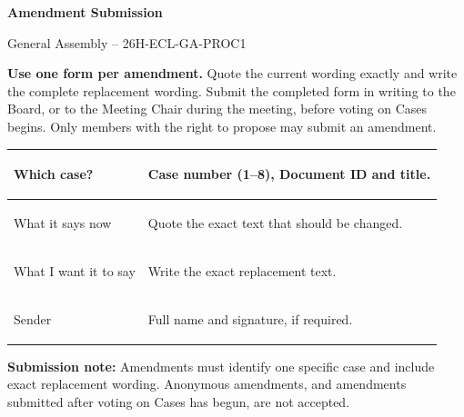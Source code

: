 \documentclass{../../../Common/Latex/Templates/rapport}
\date{\meetingdate, \meetingtime}
\begin{document}
\reportmainmatter
\small
\setlength{\parindent}{0pt}
\setlength{\tabcolsep}{6pt}
\renewcommand{\arraystretch}{1.2}

\begin{center}
  {\Large\bfseries Amendment Submission}\par
  \vspace{0.15cm}
  {\normalsize General Assembly -- 26H-ECL-GA-PROC1}\par
  \vspace{0.1cm}
  {\small \meetingline}\par
\end{center}

\vspace{0.2cm}
\textbf{Use one form per amendment.} Quote the current wording exactly and write the complete replacement wording. Submit the completed form in writing to the Board, or to the Meeting Chair during the meeting, before voting on Cases begins. Only members with the right to propose may submit an amendment.

\vspace{0.4cm}
\begin{tabularx}{\textwidth}{|>{\bfseries\raggedright\arraybackslash}p{3.7cm}|X|}
  \hline
  Which case?           & \rule{0pt}{1.2cm}Case number (1--8), Document ID and title.  \\
  \hline
  What it says now      & \rule{0pt}{3.2cm}Quote the exact text that should be changed. \\
  \hline
  What I want it to say & \rule{0pt}{3.2cm}Write the exact replacement text.            \\
  \hline
  Sender                & \rule{0pt}{1.2cm}Full name and signature, if required.        \\
  \hline
\end{tabularx}

\vfill
\textbf{Submission note:} Amendments must identify one specific case and include exact replacement wording. Anonymous amendments, and amendments submitted after voting on Cases has begun, are not accepted.
\end{document}
